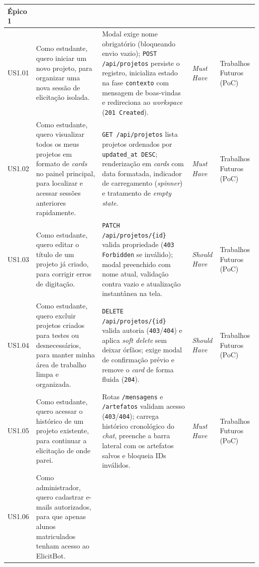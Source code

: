 {\begin{xltabular}{\textwidth}{|l|>{\raggedright\arraybackslash}p{4.0cm}|>{\raggedright\arraybackslash}X|p{1.9cm}|>{\raggedright\arraybackslash}p{2.2cm}|}
    \textbf{Épico 1} &  \\
    \midrule
    US1.01 & Como estudante, quero iniciar um novo projeto, para organizar uma nova sessão de elicitação isolada. & 
    Modal exige nome obrigatório (bloqueando envio vazio); \texttt{POST /api/projetos} persiste o registro, inicializa estado na fase \texttt{contexto} com mensagem de boas-vindas e redireciona ao \textit{workspace} (\texttt{201 Created}). & 
    \textit{Must Have} & Trabalhos Futuros (PoC) \\
    \midrule
    US1.02 & Como estudante, quero visualizar todos os meus projetos em formato de \textit{cards} no painel principal, para localizar e acessar sessões anteriores rapidamente. & 
    \texttt{GET /api/projetos} lista projetos ordenados por \texttt{updated\_at DESC}; renderização em \textit{cards} com data formatada, indicador de carregamento (\textit{spinner}) e tratamento de \textit{empty state}. & 
    \textit{Must Have} & Trabalhos Futuros (PoC) \\
    \midrule
    US1.03 & Como estudante, quero editar o título de um projeto já criado, para corrigir erros de digitação. & 
    \texttt{PATCH /api/projetos/\{id\}} valida propriedade (\texttt{403 Forbidden} se inválido); modal preenchido com nome atual, validação contra vazio e atualização instantânea na tela. & 
    \textit{Should Have} & Trabalhos Futuros (PoC) \\
    \midrule
    US1.04 & Como estudante, quero excluir projetos criados para testes ou desnecessários, para manter minha área de trabalho limpa e organizada. & 
    \texttt{DELETE /api/projetos/\{id\}} valida autoria (\texttt{403}/\texttt{404}) e aplica \textit{soft delete} sem deixar órfãos; exige modal de confirmação prévio e remove o \textit{card} de forma fluida (\texttt{204}). & 
    \textit{Should Have} & Trabalhos Futuros (PoC) \\
    \midrule
    US1.05 & Como estudante, quero acessar o histórico de um projeto existente, para continuar a elicitação de onde parei. & 
    Rotas \texttt{/mensagens} e \texttt{/artefatos} validam acesso (\texttt{403}/\texttt{404}); carrega histórico cronológico do \textit{chat}, preenche a barra lateral com os artefatos salvos e bloqueia IDs inválidos. & 
    \textit{Must Have} & Trabalhos Futuros (PoC) \\
    \midrule
    US1.06 & Como administrador, quero cadastrar e-mails autorizados, para que apenas alunos matriculados tenham acesso ao ElicitBot. & 

\end{xltabular}}
